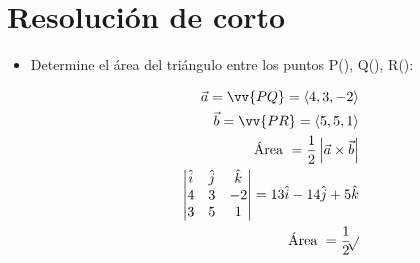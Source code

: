 \section{Resolución de corto}
\begin{itemize}
    \item Determine el área del triángulo entre los puntos P(), Q(), R():
        \begin{center}
            \begin{align*}
                \vec{a} = \vv{PQ} = \left\langle 4,3,-2 \right\rangle \\ 
                \vec{b} = \vv{PR} = \left\langle 5,5,1 \right\rangle \\ 
                \text{  Área  } = \frac{1}{2} \left| \vec{a} \times  \vec{b} \right| \\ 
                \begin{vmatrix}
                    \hat{i} & \hat{j} & \hat{k} \\ 
                    4 & 3 & -2 \\ 
                    3 & 5 & 1 \\ 
                \end{vmatrix} = 13 \hat{i} - 14 \hat{j} + 5 \hat{k} \\  
                \text{  Área  } = \frac{1}{2} \sqrt[]{} \\ 
            \end{align*}
        \end{center}

\end{itemize}
    



